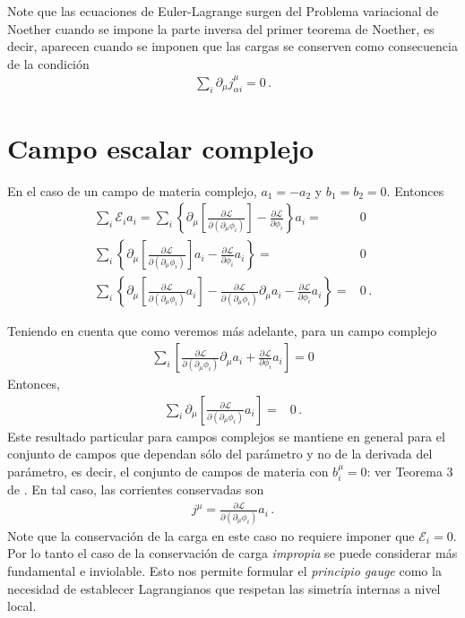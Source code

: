 Note que las ecuaciones de Euler-Lagrange surgen del Problema variacional de Noether cuando se impone la parte inversa del primer teorema de Noether, es decir, aparecen cuando se imponen que las cargas se conserven como consecuencia de la condición
\begin{align}
   \sum_i \partial_{\mu} j^{\mu}_{\alpha i}=0\,.
\end{align}



\section{Campo escalar complejo}

En el caso de un campo de materia complejo, $a_1=-a_2$ y $b_1=b_2=0$. Entonces
\begin{align}
 \sum_i \mathcal{E}_ia_i=\sum_i \left\{ \partial_{\mu} \left[ \frac{\partial\mathcal{L}}{\partial(\partial_{\mu}\phi_i)}\right]-\frac{\partial\mathcal{L}}{\partial\phi_i} \right\}a_i=&0 \nonumber\\
\sum_i \left\{ \partial_{\mu} \left[ \frac{\partial\mathcal{L}}{\partial(\partial_{\mu}\phi_i)}\right]a_i-\frac{\partial\mathcal{L}}{\partial\phi_i}a_i \right\}=&0 \nonumber\\
\sum_i \left\{ \partial_{\mu} \left[ \frac{\partial\mathcal{L}}{\partial(\partial_{\mu}\phi_i)}a_i\right]-\frac{\partial\mathcal{L}}{\partial(\partial_{\mu}\phi_i)}\partial_{\mu}a_i-\frac{\partial\mathcal{L}}{\partial\phi_i}a_i \right\}=&0 \,.
\end{align}

\begin{frame}
Teniendo en cuenta que como veremos más adelante, para un campo complejo
\begin{align}
\sum_i \left[\frac{\partial\mathcal{L}}{\partial(\partial_{\mu}\phi_i)}\partial_{\mu}a_i+\frac{\partial\mathcal{L}}{\partial\phi_i}a_i \right]=0
\end{align}
Entonces, 
\begin{align}
\sum_i \partial_{\mu} \left[ \frac{\partial\mathcal{L}}{\partial(\partial_{\mu}\phi_i)}a_i\right]=&0\,.
\end{align}
Este resultado particular para campos complejos se mantiene en general para el conjunto de campos que dependan sólo del parámetro y no de la derivada del parámetro, es decir, el conjunto de campos de materia con $b_i^\mu=0$: ver Teorema 3 de \cite{Brading:2000hc}. En tal caso, las corrientes conservadas son
\begin{align}
\label{eq:tnoeth2}
j^\mu=\frac{\partial\mathcal{L}}{\partial(\partial_{\mu}\phi_i)}a_{i}\,.
\end{align}
Note que la conservación de la carga en este caso no requiere imponer que $\mathcal{E}_i=0$. Por lo tanto el caso de la conservación de carga \emph{impropia} se puede considerar más fundamental e inviolable. Esto nos permite formular el \emph{principio gauge} como la necesidad de establecer Lagrangianos que respetan las simetría internas a nivel local.
\end{frame}


